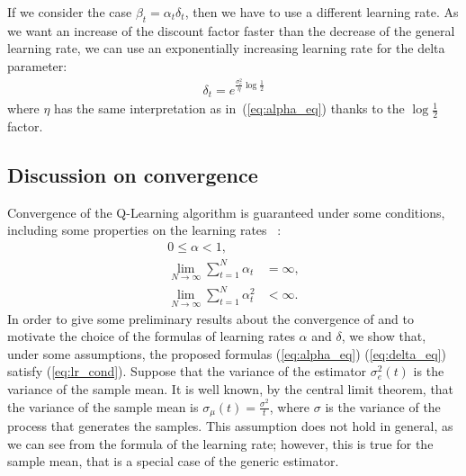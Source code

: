 \documentclass[conference]{IEEEtran}
\begin{document}
If we consider the case $\beta_t=\alpha_t\delta_t$, then we have to use a different learning rate. As we want an increase of the discount factor faster than the decrease of the general learning rate, we can use an exponentially increasing learning rate for the delta parameter:
\begin{align}\label{eq:delta_eq}
 \delta_t = e^{\frac{\sigma_e^2}{\eta}\log\frac{1}{2}}
\end{align}
where $\eta$ has the same interpretation as in~(\ref{eq:alpha_eq}) thanks to the $\log\frac{1}{2}$ factor.

\subsection{Discussion on convergence}
Convergence of the Q-Learning algorithm is guaranteed under some conditions, including some properties on the learning rates ~\cite{EvenDar2001, watkins1992q}:
\begin{align}
 0 \leq \alpha < 1,\nonumber \\
 \lim_{N\rightarrow\infty} \sum_{t=1}^{N}\alpha_t & = \infty,\nonumber \\
 \lim_{N\rightarrow\infty} \sum_{t=1}^{N}\alpha_t^2 & < \infty. \label{eq:lr_cond}
\end{align}
In order to give some preliminary results about the convergence of \alg and to motivate the choice of the formulas of learning rates $\alpha$ and $\delta$, we show that, under some assumptions, the proposed formulas (\ref{eq:alpha_eq}) (\ref{eq:delta_eq}) satisfy (\ref{eq:lr_cond}). Suppose that the variance of the estimator $\sigma_e^2(t)$ is the variance of the sample mean. It is well known, by the central limit theorem, that the variance of the sample mean is $\sigma_{\mu}(t)=\frac{\sigma^2}{t}$, where $\sigma$ is the variance of the process that generates the samples.
This assumption does not hold in general, as we can see from the formula of the learning rate; however, this is true for the sample mean, that is a special case of the generic estimator.
\end{document}
